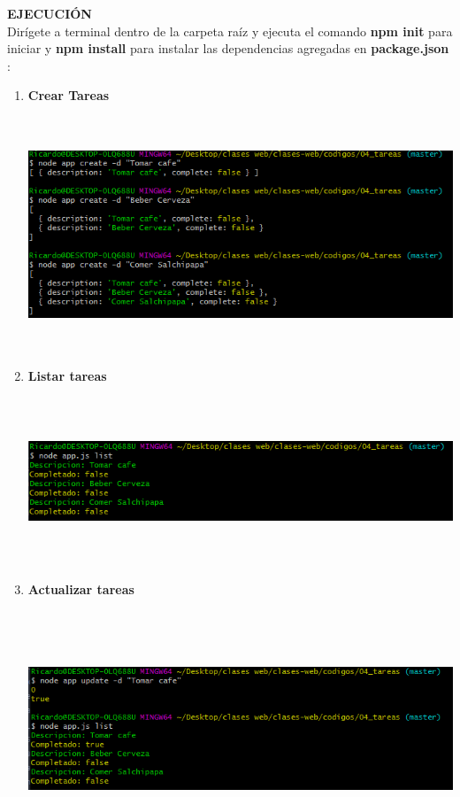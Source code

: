 \documentclass{report}
\begin{document}
\textbf{EJECUCIÓN}\\
Dirígete a terminal dentro de la carpeta raíz y ejecuta el comando \textbf{npm init} para iniciar y \textbf{npm install} para instalar las dependencias agregadas en \textbf{package.json} :
\begin{enumerate}
  \item \textbf{Crear Tareas}
  \begin{center}
    \includegraphics[width=15cm, height=7cm]{7.png}
  \end{center}
  \item \textbf{Listar tareas}
  \begin{center}
    \includegraphics[width=15cm, height=5cm]{8.png}
  \end{center}
  \item \textbf{Actualizar tareas}
  \begin{center}
    \includegraphics[width=15cm, height=7cm]{9.png}

\end{center}
\end{enumerate}
\end{document}
